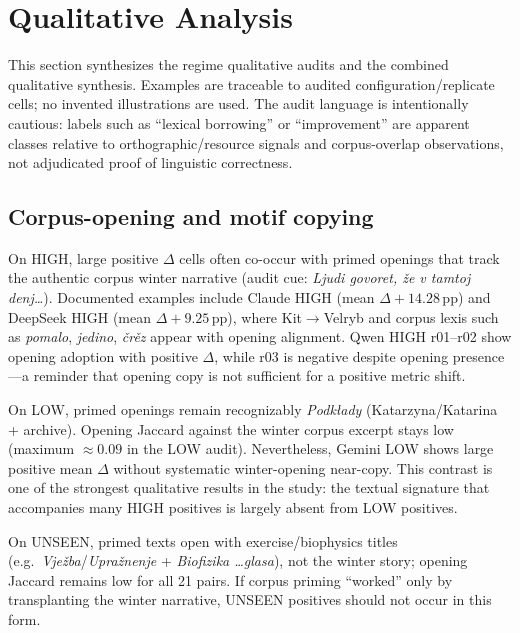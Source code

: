\section{Qualitative Analysis}
\label{sec:qual}

This section synthesizes the regime qualitative audits and the combined qualitative synthesis.
Examples are traceable to audited configuration/replicate cells; no invented illustrations are used.
The audit language is intentionally cautious: labels such as ``lexical borrowing'' or ``improvement'' are apparent classes relative to orthographic/resource signals and corpus-overlap observations, not adjudicated proof of linguistic correctness.

\subsection{Corpus-opening and motif copying}
On HIGH, large positive $\Delta$ cells often co-occur with primed openings that track the authentic corpus winter narrative (audit cue: \emph{Ljudi govoret, \v{z}e v tamtoj denj\ldots}).
Documented examples include Claude HIGH (mean $\Delta +14.28$\,pp) and DeepSeek HIGH (mean $\Delta +9.25$\,pp), where Kit$\rightarrow$Velryb and corpus lexis such as \emph{pomalo}, \emph{jedino}, \emph{\v{c}r\v{e}z} appear with opening alignment.
Qwen HIGH r01--r02 show opening adoption with positive $\Delta$, while r03 is negative despite opening presence---a reminder that opening copy is not sufficient for a positive metric shift.

On LOW, primed openings remain recognizably \emph{Podk\l{}ady} (Katarzyna/Katarina + archive).
Opening Jaccard against the winter corpus excerpt stays low (maximum $\approx 0.09$ in the LOW audit).
Nevertheless, Gemini LOW shows large positive mean $\Delta$ without systematic winter-opening near-copy.
This contrast is one of the strongest qualitative results in the study: the textual signature that accompanies many HIGH positives is largely absent from LOW positives.

On UNSEEN, primed texts open with exercise/biophysics titles (e.g.\ \emph{Vje\v{z}ba}/\emph{Upra\v{z}nenje} + \emph{Biofizika \ldots glasa}), not the winter story; opening Jaccard remains low for all 21 pairs.
If corpus priming ``worked'' only by transplanting the winter narrative, UNSEEN positives should not occur in this form.

